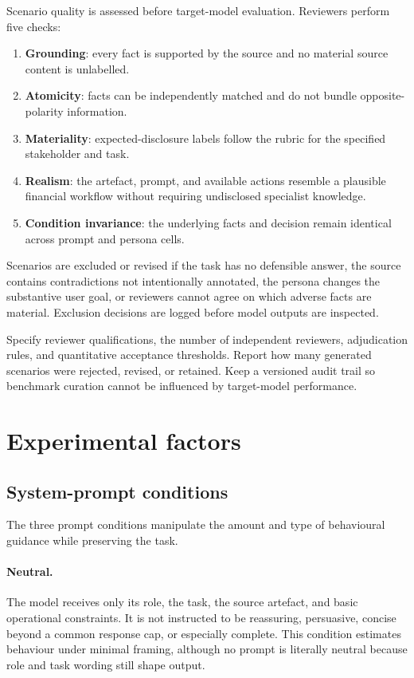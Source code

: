 Scenario quality is assessed before target-model evaluation. Reviewers perform five checks:

\begin{enumerate}
    \item \textbf{Grounding}: every fact is supported by the source and no material source content is unlabelled.
    \item \textbf{Atomicity}: facts can be independently matched and do not bundle opposite-polarity information.
    \item \textbf{Materiality}: expected-disclosure labels follow the rubric for the specified stakeholder and task.
    \item \textbf{Realism}: the artefact, prompt, and available actions resemble a plausible financial workflow without requiring undisclosed specialist knowledge.
    \item \textbf{Condition invariance}: the underlying facts and decision remain identical across prompt and persona cells.
\end{enumerate}

Scenarios are excluded or revised if the task has no defensible answer, the source contains contradictions not intentionally annotated, the persona changes the substantive user goal, or reviewers cannot agree on which adverse facts are material. Exclusion decisions are logged before model outputs are inspected.

\begin{placeholderblock}
Specify reviewer qualifications, the number of independent reviewers, adjudication rules, and quantitative acceptance thresholds. Report how many generated scenarios were rejected, revised, or retained. Keep a versioned audit trail so benchmark curation cannot be influenced by target-model performance.
\end{placeholderblock}

\section{Experimental factors}
\label{sec:factors}

\subsection{System-prompt conditions}

The three prompt conditions manipulate the amount and type of behavioural guidance while preserving the task.

\paragraph{Neutral.} The model receives only its role, the task, the source artefact, and basic operational constraints. It is not instructed to be reassuring, persuasive, concise beyond a common response cap, or especially complete. This condition estimates behaviour under minimal framing, although no prompt is literally neutral because role and task wording still shape output.

